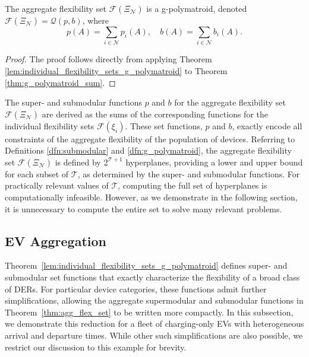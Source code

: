     \begin{theorem}[Aggregation]\label{thm:agg_flex_set}
        The aggregate flexibility set $\mathcal{F}(\Xi_{\mathcal{N}})$ is a g-polymatroid, denoted $\mathcal{F}(\Xi_{\mathcal{N}}) = \mathcal{Q}(p, b)$, where
        \begin{equation}\label{eq:agg_super_sub}
            p(A) = \sum_{i \in \mathcal{N}} p_i(A), \quad 
            b(A) = \sum_{i \in \mathcal{N}} b_i(A).
        \end{equation}
        \end{theorem}
    \begin{proof}
        The proof follows directly from applying Theorem \ref{lem:individual_flexibility_sets_g_polymatroid} to Theorem \ref{thm:g_polymatroid_sum}.
    \end{proof}
    \begin{remark}
        
    The super- and submodular functions $p$ and $b$ for the aggregate flexibility set $\mathcal{F}(\Xi_{\mathcal{N}})$ are derived as the sums of the corresponding functions for the individual flexibility sets $\mathcal{F}(\xi_i)$.
    These set functions, $p$ and $b$, exactly encode all constraints of the aggregate flexibility of the population of devices.
    Referring to Definitions \ref{dfn:submodular} and \ref{dfn:g_polymatroid}, the aggregate flexibility set $\mathcal{F}(\Xi_{\mathcal{N}})$ is defined by $2^{\mathcal{T}+1}$ hyperplanes, providing a lower and upper bound for each subset of $\mathcal{T}$, as determined by the super- and submodular functions.
    For practically relevant values of $\mathcal{T}$, computing the full set of hyperplanes is computationally infeasible.
    However, as we demonstrate in the following section, it is unnecessary to compute the entire set to solve many relevant problems.
    \end{remark}


\subsection{EV Aggregation}
Theorem~\ref{lem:individual_flexibility_sets_g_polymatroid} defines super- and submodular set functions that exactly characterize the flexibility of a broad class of DERs. For particular device categories, these functions admit further simplifications, allowing the aggregate supermodular and submodular functions in Theorem~\ref{thm:agg_flex_set} to be written more compactly. In this subsection, we demonstrate this reduction for a fleet of charging-only EVs with heterogeneous arrival and departure times. While other such simplifications are also possible, we restrict our discussion to this example for brevity.



